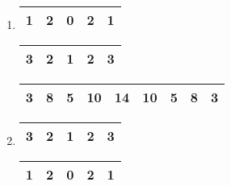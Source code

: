 \begin{question}
    \begin{enumerate}[label=\textbf{\alph*})]
        \item
        
        \begin{minipage}{\linewidth}
            \parbox{.45\linewidth}{
                \centering 
                \begin{tabular}{|c|c|c|c|c|}
                    \hline 
                    1 & 2 & 0 & 2 & 1 \\
                    \hline
                \end{tabular}
            }
            \parbox{.45\linewidth}{
                \centering 
                \begin{tabular}{|c|c|c|c|c|}
                    \hline 
                    3 & 2 & 1 & 2 & 3 \\
                    \hline
                \end{tabular}
            }
        \end{minipage}

        \begin{table}[ht]
            \centering 
            \begin{tabular}{|c|c|c|c|c|c|c|c|c|}
                \hline 
                3 & 8 & 5 & 10 & 14 & 10 & 5 & 8 & 3 \\
                \hline
            \end{tabular}
        \end{table}

        \item 

        \begin{minipage}{\linewidth}
            \parbox{.45\linewidth}{
                \centering 
                \begin{tabular}{|c|c|c|c|c|}
                    \hline 
                    3 & 2 & 1 & 2 & 3 \\
                    \hline
                \end{tabular}
            }
            \parbox{.45\linewidth}{
                \centering 
                \begin{tabular}{|c|c|c|c|c|}
                    \hline 
                    1 & 2 & 0 & 2 & 1 \\
                    \hline
                \end{tabular}
            }
        \end{minipage}


\end{enumerate}
\end{question}
